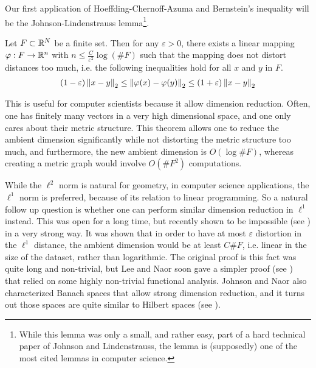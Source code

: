 \documentclass[11pt]{article}
\begin{document}
Our first application of Hoeffding-Chernoff-Azuma and Bernstein's inequality will be the Johnson-Lindenstrauss lemma\footnote{While this lemma was only a small, and rather easy, part of a hard technical paper of Johnson and Lindenstrauss, the lemma is (supposedly) one of the most cited lemmas in computer science.}.

\begin{theorem}
  \label{thm:johnson-lindenstrauss}
  Let $F \subset \mathbb{R}^N$ be a finite set.
  Then for any $\varepsilon > 0$, there exists a linear mapping $\varphi: F \to \mathbb{R}^n$ with $n \leq \frac{C}{\varepsilon^2} \log(\#F)$ such that the mapping does not distort distances too much, i.e. the following inequalities hold for all $x$ and $y$ in $F$.
  \begin{align*}
    (1-\varepsilon) \left\lVert x-y\right\rVert_2 \leq \left\lVert\varphi(x) - \varphi(y)\right\rVert_2 \leq (1+\varepsilon) \left\lVert x-y\right\rVert_2
  \end{align*}
\end{theorem}

  This is useful for computer scientists because it allow dimension reduction.
  Often, one has finitely many vectors in a very high dimensional space, and one only cares about their metric structure.
  This theorem allows one to reduce the ambient dimension significantly while not distorting the metric structure too much, and furthermore, the new ambient dimension is $O(\log \#F)$, whereas creating a metric graph would involve $O(\#F^2)$ computations.

While the $\ell^2$ norm is natural for geometry, in computer science applications, the $\ell^1$ norm is preferred, because of its relation to linear programming. So a natural follow up question is whether one can perform similar dimension reduction in $\ell^1$ instead.
This was open for a long time, but recently shown to be impossible (see \cite{10.1145/1089023.1089026}) in a very strong way.
It was shown that in order to have at most $\varepsilon$ distortion in the $\ell^1$ distance, the ambient dimension would be at least $C \# F$, i.e. linear in the size of the dataset, rather than logarithmic. The original proof is this fact was quite long and non-trivial, but Lee and Naor soon gave a simpler proof (see \cite{lee2004embedding}) that relied on some highly non-trivial functional analysis. Johnson and Naor also characterized Banach spaces that allow strong dimension reduction, and it turns out those spaces are quite similar to Hilbert spaces (see \cite{2008arXiv0807.1919J}).
\end{document}
